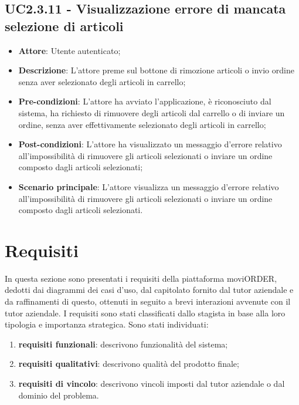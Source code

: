 \subsection{UC2.3.11 - Visualizzazione errore di mancata selezione di articoli}

\begin{itemize}
	\item \textbf{Attore}: Utente autenticato;
	\item \textbf{Descrizione}: L'attore preme sul bottone di rimozione articoli o invio ordine senza aver selezionato degli articoli in carrello;
	\item \textbf{Pre-condizioni}: L'attore ha avviato l'applicazione, è riconosciuto dal sistema, ha richiesto di rimuovere degli articoli dal carrello o di inviare un ordine, senza aver effettivamente selezionato degli articoli in carrello;
	\item \textbf{Post-condizioni}: L'attore ha visualizzato un messaggio d'errore relativo all'impossibilità di rimuovere gli articoli selezionati o inviare un ordine composto dagli articoli selezionati;
	\item \textbf{Scenario principale}: L'attore visualizza un messaggio d'errore relativo all'impossibilità di rimuovere gli articoli selezionati o inviare un ordine composto dagli articoli selezionati.
\end{itemize}

\newpage

\section{Requisiti}

In questa sezione sono presentati i requisiti della piattaforma moviORDER, dedotti dai diagrammi dei casi d'uso, dal capitolato fornito dal tutor aziendale e da raffinamenti di questo, ottenuti in seguito a brevi interazioni avvenute con il tutor aziendale. I requisiti sono stati classificati dallo stagista in base alla loro tipologia e importanza strategica. Sono stati individuati:
\begin{enumerate}
	\item \textbf{requisiti funzionali}: descrivono funzionalità del sistema;
	\item \textbf{requisiti qualitativi}: descrivono qualità del prodotto finale;
	\item \textbf{requisiti di vincolo}: descrivono vincoli imposti dal tutor aziendale o dal dominio del problema.
\end{enumerate}

